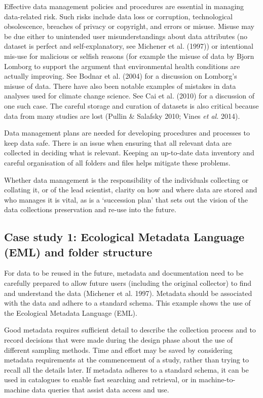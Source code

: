 \documentclass[11pt,a4paper]{article}
\begin{document}
Effective data management policies and procedures are essential in
managing data-related risk. Such risks include data loss or corruption,
technological obsolescence, breaches of privacy or copyright, and errors
or misuse. Misuse may be due either to unintended user misunderstandings
about data attributes (no dataset is perfect and self-explanatory, see
Michener et al. (1997)) or intentional mis-use for malicious or selfish
reasons (for example the misuse of data by Bjorn Lomborg to support the
argument that environmental health conditions are actually improving.
See Bodnar et al. (2004) for a discussion on Lomborg's misuse of data.
There have also been notable examples of mistakes in data analyses used
for climate change science. See Cai et al. (2010) for a discussion of
one such case. The careful storage and curation of datasets is also
critical because data from many studies are lost (Pullin \& Salafsky
2010; Vines \emph{et al.} 2014).

Data management plans are needed for developing procedures and processes
to keep data safe. There is an issue when ensuring that all relevant
data are collected in deciding what is relevant. Keeping an up-to-date
data inventory and careful organisation of all folders and files helps
mitigate these problems.

Whether data management is the responsibility of the individuals
collecting or collating it, or of the lead scientist, clarity on how and
where data are stored and who manages it is vital, as is a `succession
plan' that sets out the vision of the data collections preservation and
re-use into the future.

\subsection{Case study 1: Ecological Metadata Language (EML) and folder
structure}\label{case-study-1-ecological-metadata-language-eml-and-folder-structure}

For data to be reused in the future, metadata and documentation need to
be carefully prepared to allow future users (including the original
collector) to find and understand the data (Michener et al. 1997).
Metadata should be associated with the data and adhere to a standard
schema. This example shows the use of the Ecological Metadata Language
(EML).

Good metadata requires sufficient detail to describe the collection
process and to record decisions that were made during the design phase
about the use of different sampling methods. Time and effort may be
saved by considering metadata requirements at the commencement of a
study, rather than trying to recall all the details later. If metadata
adheres to a standard schema, it can be used in catalogues to enable
fast searching and retrieval, or in machine-to-machine data queries that
assist data access and use.
\end{document}
